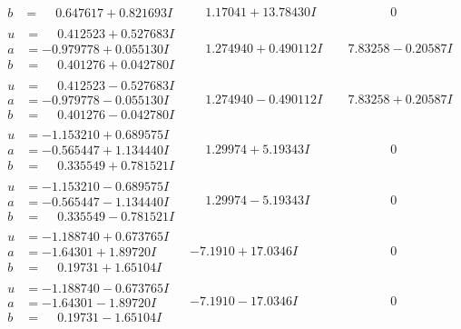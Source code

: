 \documentclass[1p]{elsarticle_modified}
\theoremstyle{definition}
\begin{document}
$$\begin{array}{c|c|c}
\begin{aligned}
b &= \phantom{-}0.647617 + 0.821693 I\end{aligned}
 & \phantom{-}1.17041 + 13.78430 I & \phantom{-0.000000 } 0 \\ \hline\begin{aligned}
u &= \phantom{-}0.412523 + 0.527683 I \\
a &= -0.979778 + 0.055130 I \\
b &= \phantom{-}0.401276 + 0.042780 I\end{aligned}
 & \phantom{-}1.274940 + 0.490112 I & \phantom{-}7.83258 - 0.20587 I \\ \hline\begin{aligned}
u &= \phantom{-}0.412523 - 0.527683 I \\
a &= -0.979778 - 0.055130 I \\
b &= \phantom{-}0.401276 - 0.042780 I\end{aligned}
 & \phantom{-}1.274940 - 0.490112 I & \phantom{-}7.83258 + 0.20587 I \\ \hline\begin{aligned}
u &= -1.153210 + 0.689575 I \\
a &= -0.565447 + 1.134440 I \\
b &= \phantom{-}0.335549 + 0.781521 I\end{aligned}
 & \phantom{-}1.29974 + 5.19343 I & \phantom{-0.000000 } 0 \\ \hline\begin{aligned}
u &= -1.153210 - 0.689575 I \\
a &= -0.565447 - 1.134440 I \\
b &= \phantom{-}0.335549 - 0.781521 I\end{aligned}
 & \phantom{-}1.29974 - 5.19343 I & \phantom{-0.000000 } 0 \\ \hline\begin{aligned}
u &= -1.188740 + 0.673765 I \\
a &= -1.64301 + 1.89720 I \\
b &= \phantom{-}0.19731 + 1.65104 I\end{aligned}
 & -7.1910 + 17.0346 I & \phantom{-0.000000 } 0 \\ \hline\begin{aligned}
u &= -1.188740 - 0.673765 I \\
a &= -1.64301 - 1.89720 I \\
b &= \phantom{-}0.19731 - 1.65104 I\end{aligned}
 & -7.1910 - 17.0346 I & \phantom{-0.000000 } 0 \\ \hline\begin{aligned}

\end{aligned}
\end{array}$$
\end{document}
